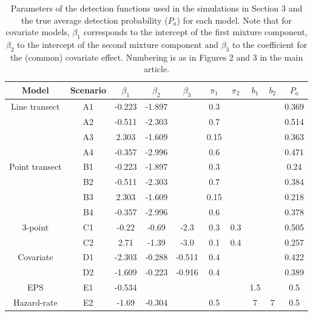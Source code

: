 \documentclass[10pt]{article}
\begin{document}
\begin{table}[htbp]
\centering
\caption{Parameters of the detection functions used in the simulations in Section 3 and the true average detection probability ($P_a$) for each model. Note that for covariate models, $\beta_1$ corresponds to the intercept of the first mixture component, $\beta_2$ to the intercept of the second mixture component and $\beta_3$ to the coefficient for the (common) covariate effect. Numbering is as in Figures 2 and 3 in the main article.}
\begin{tabular}{c c c c c c c c c c}\\
Model & Scenario & $\beta_1$ & $\beta_2$ & $\beta_3$ & $\pi_1$ & $\pi_2$ & $b_1$ & $b_2$ & $P_a$ \\
\hline
Line transect & A1 & -0.223 & -1.897 & &  0.3 & & & & 0.369\\
 & A2 & -0.511 & -2.303 & &  0.7 & & & & 0.514\\
 & A3 &  2.303 & -1.609 & & 0.15 & & & & 0.363\\
 & A4 & -0.357 & -2.996 & &  0.6 & & & & 0.471\\
Point transect &B1 & -0.223 & -1.897 & &  0.3 & & & & 0.24\\
 & B2 & -0.511 & -2.303 & &  0.7 & & & & 0.384\\
 & B3 &  2.303 & -1.609 & & 0.15 & & & & 0.218\\
 & B4 & -0.357 & -2.996 & &  0.6 & & & & 0.378\\
3-point & C1 &  -0.22 &  -0.69 &  -2.3 & 0.3 & 0.3 & & & 0.505\\
 & C2 &   2.71 &  -1.39 &  -3.0 & 0.1 & 0.4 & & & 0.257\\
Covariate & D1 & -2.303 & -0.288 & -0.511 & 0.4 & & & & 0.422\\
 & D2 & -1.609 & -0.223 & -0.916 & 0.4 & & & & 0.389\\
 EPS & E1 & -0.534 & & & & & 1.5& & 0.5 \\
 Hazard-rate & E2 & -1.69 & -0.304 & & 0.5 & & 7 & 7 & 0.5\\
\hline
\end{tabular}
\label{partable}
\bigskip
\end{table}



\end{document}
